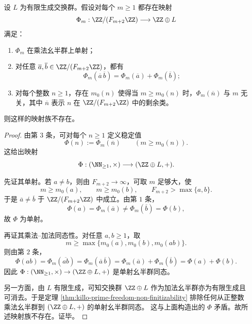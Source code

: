\begin{theorem}[跨分辨率相容的有限秩加法账本不能同态化全部可见乘法]\label{thm:xi-visible-arithmetic-no-compatible-finite-rank-ledger}
设 \(L\) 为有限生成交换群。假设对每个 \(m\ge 1\) 都存在映射
\[
\Phi_m:\ZZ/(F_{m+2}\ZZ)\longrightarrow \ZZ\oplus L
\]
满足：
\begin{enumerate}
  \item \(\Phi_m\) 在乘法幺半群上单射；
  \item 对任意 \(\overline a,\overline b\in \ZZ/(F_{m+2}\ZZ)\)，都有
  \[
  \Phi_m(\overline a\,\overline b)=\Phi_m(\overline a)+\Phi_m(\overline b);
  \]
  \item 对每个整数 \(n\ge 1\)，存在 \(m_0(n)\) 使得当 \(m\ge m_0(n)\) 时，\(\Phi_m(\overline n)\) 与 \(m\) 无关，其中 \(\overline n\) 表示 \(n\) 在 \(\ZZ/(F_{m+2}\ZZ)\) 中的剩余类。
\end{enumerate}
则这样的映射族不存在。
\end{theorem}
\begin{proof}
由第 \(3\) 条，可对每个 \(n\ge 1\) 定义稳定值
\[
\Phi(n):=\Phi_m(\overline n)
\qquad
(m\ge m_0(n)).
\]
这给出映射
\[
\Phi:(\NN_{\ge 1},\times)\longrightarrow (\ZZ\oplus L,+).
\]

先证其单射。若 \(a\neq b\)，则由 \(F_{m+2}\to\infty\)，可取 \(m\) 足够大，使
\[
m\ge m_0(a),\qquad m\ge m_0(b),\qquad F_{m+2}>\max\{a,b\}.
\]
于是 \(\overline a\neq \overline b\) 于 \(\ZZ/(F_{m+2}\ZZ)\) 中成立。由第 \(1\) 条，
\[
\Phi(a)=\Phi_m(\overline a)\neq \Phi_m(\overline b)=\Phi(b),
\]
故 \(\Phi\) 为单射。

再证其乘法--加法同态性。对任意 \(a,b\ge 1\)，取
\[
m\ge \max\{m_0(a),m_0(b),m_0(ab)\}.
\]
则由第 \(2\) 条，
\[
\Phi(ab)
=
\Phi_m(\overline{ab})
=
\Phi_m(\overline a\,\overline b)
=
\Phi_m(\overline a)+\Phi_m(\overline b)
=
\Phi(a)+\Phi(b).
\]
因此 \(\Phi:(\NN_{\ge 1},\times)\to (\ZZ\oplus L,+)\) 是单射幺半群同态。

另一方面，由 \(L\) 有限生成，可知交换群 \(\ZZ\oplus L\) 作为加法幺半群亦为有限生成且可消去。于是定理 \ref{thm:killo-prime-freedom-non-finitizability} 排除任何从正整数乘法幺半群到 \((\ZZ\oplus L,+)\) 的单射幺半群同态。
这与上面构造出的 \(\Phi\) 矛盾。故所述映射族不存在。证毕。
\end{proof}

